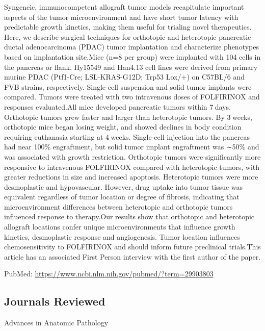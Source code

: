 \documentclass[]{article}
\begin{document}
Syngeneic, immunocompetent allograft tumor models recapitulate important
aspects of the tumor microenvironment and have short tumor latency with
predictable growth kinetics, making them useful for trialing novel
therapeutics. Here, we describe surgical techniques for orthotopic and
heterotopic pancreatic ductal adenocarcinoma (PDAC) tumor implantation
and characterize phenotypes based on implantation site.Mice (n=8 per
group) were implanted with 104 cells in the pancreas or flank. Hy15549
and Han4.13 cell lines were derived from primary murine PDAC (Ptf1-Cre;
LSL-KRAS-G12D; Trp53 Lox/+) on C57BL/6 and FVB strains, respectively.
Single-cell suspension and solid tumor implants were compared. Tumors
were treated with two intravenous doses of FOLFIRINOX and responses
evaluated.All mice developed pancreatic tumors within 7 days. Orthotopic
tumors grew faster and larger than heterotopic tumors. By 3 weeks,
orthotopic mice began losing weight, and showed declines in body
condition requiring euthanasia starting at 4 weeks. Single-cell
injection into the pancreas had near 100\% engraftment, but solid tumor
implant engraftment was ∼50\% and was associated with growth
restriction. Orthotopic tumors were significantly more responsive to
intravenous FOLFIRINOX compared with heterotopic tumors, with greater
reductions in size and increased apoptosis. Heterotopic tumors were more
desmoplastic and hypovascular. However, drug uptake into tumor tissue
was equivalent regardless of tumor location or degree of fibrosis,
indicating that microenvironment differences between heterotopic and
orthotopic tumors influenced response to therapy.Our results show that
orthotopic and heterotopic allograft locations confer unique
microenvironments that influence growth kinetics, desmoplastic response
and angiogenesis. Tumor location influences chemosensitivity to
FOLFIRINOX and should inform future preclinical trials.This article has
an associated First Person interview with the first author of the paper.

PubMed: \url{https://www.ncbi.nlm.nih.gov/pubmed/?term=29903803}

{}

{}

\pagebreak

\hypertarget{journals-reviewed}{%
\subsection{Journals Reviewed}\label{journals-reviewed}}

Advances in Anatomic Pathology
\end{document}
